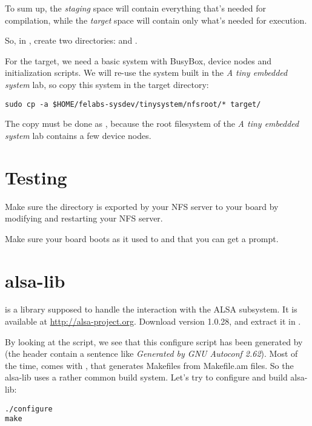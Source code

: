 To sum up, the {\em staging} space will contain everything that's
needed for compilation, while the {\em target} space will contain only
what's needed for execution.

So, in , create two
directories:  and .

For the target, we need a basic system with BusyBox, device nodes and
initialization scripts. We will re-use the system built in the {\em A
  tiny embedded system} lab, so copy this system in the target
directory:

\begin{verbatim}
sudo cp -a $HOME/felabs-sysdev/tinysystem/nfsroot/* target/
\end{verbatim}

The copy must be done as , because the root filesystem of
the {\em A tiny embedded system} lab contains a few device nodes.

\section{Testing}

Make sure the  directory is exported by your NFS server
to your board by modifying  and restarting your NFS
server.

Make sure your board boots as it used to and that you can get a
prompt.

\section{alsa-lib}

 is a library supposed to handle the interaction with
the ALSA subsystem. It is available at
\url{http://alsa-project.org}. Download version 1.0.28, and extract it
in .

By looking at the  script, we see that this configure
script has been generated by  (the header contain a
sentence like {\em Generated by GNU Autoconf 2.62}). Most of the time,
 comes with , that generates Makefiles
from Makefile.am files. So the alsa-lib uses a rather common build
system. Let's try to configure and build alsa-lib:

\begin{verbatim}
./configure
make
\end{verbatim}

